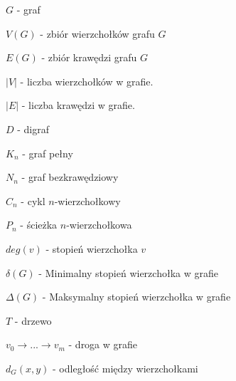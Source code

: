 $G$ - graf

$V(G)$ - zbiór wierzchołków grafu $G$

$E(G)$ - zbiór krawędzi grafu $G$

$|V|$ - liczba wierzchołków w grafie.

$|E|$ - liczba krawędzi w grafie.

$D$ - digraf

$K_n$ - graf pełny

$N_n$ - graf bezkrawędziowy

$C_n$ - cykl $n$-wierzchołkowy

$P_n$ - ścieżka $n$-wierzchołkowa

$deg(v)$ - stopień wierzchołka $v$

$\delta(G)$ - Minimalny stopień wierzchołka w grafie
 
$\Delta(G)$ - Maksymalny stopień wierzchołka w grafie

$T$ - drzewo

$v_0 \rightarrow ... \rightarrow v_m$ - droga w grafie

$d_G(x,y)$ - odległość między wierzchołkami